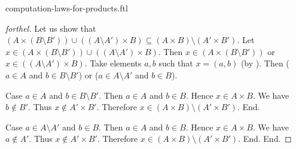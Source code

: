 \documentclass{naproche-library}
\begin{document}
\begin{smodule}{computation-laws-for-products.ftl}
\begin{proof}[forthel]
    Let us show that $(A \times (B \setminus B')) \cup ((A \setminus A') \times B) \subseteq (A \times B) \setminus (A' \times B')$.
      Let $x \in (A \times (B \setminus B')) \cup ((A \setminus A') \times B)$.
      Then $x \in (A \times (B \setminus B'))$ or $x \in ((A \setminus A') \times B)$.
      Take elements $a,b$ such that $x = (a, b)$ (by ).
      Then ($a \in A$ and $b \in B \setminus B'$) or ($a \in A \setminus A'$ and $b \in B$).

      Case $a \in A$ and $b \in B \setminus B'$.
        Then $a \in A$ and $b \in B$.
        Hence $x \in A \times B$.
        We have $b \notin B'$.
        Thus $x \notin A' \times B'$.
        Therefore $x \in (A \times B) \setminus (A' \times B')$.
      End.

      Case $a \in A \setminus A'$ and $b \in B$.
        Then $a \in A$ and $b \in B$.
        Hence $x \in A \times B$.
        We have $a \notin A'$.
        Thus $x \notin A' \times B'$.
        Therefore $x \in (A \times B) \setminus (A' \times B')$.
      End.
    End.
  \end{proof}
\end{smodule}
\end{document}
